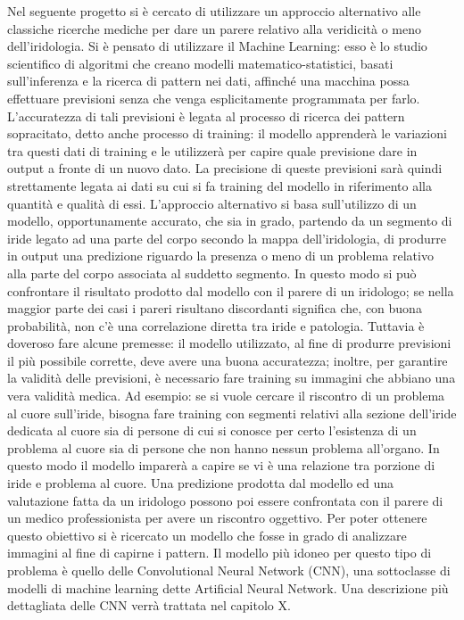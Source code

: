 Nel seguente progetto si è cercato di utilizzare un approccio alternativo alle classiche ricerche mediche per dare un parere relativo alla veridicità o meno dell’iridologia. Si è pensato di utilizzare il Machine Learning: esso è lo studio scientifico di algoritmi che creano modelli matematico-statistici, basati sull’inferenza e la ricerca di pattern nei dati, affinché una macchina possa effettuare previsioni senza che venga esplicitamente programmata per farlo. L’accuratezza di tali previsioni è legata al processo di ricerca dei pattern sopracitato, detto anche processo di training: il modello apprenderà le variazioni tra questi dati di training e le utilizzerà per capire quale previsione dare in output a fronte di un nuovo dato. La precisione di queste previsioni sarà quindi strettamente legata ai dati su cui si fa training del modello in riferimento alla quantità e qualità di essi. L’approccio alternativo si basa sull’utilizzo di un modello, opportunamente accurato, che sia in grado, partendo da un segmento di iride legato ad una parte del corpo secondo la mappa dell’iridologia, di produrre in output una predizione riguardo la presenza o meno di un problema relativo alla parte del corpo associata al suddetto segmento. In questo modo si può confrontare il risultato prodotto dal modello con il parere di un iridologo; se nella maggior parte dei casi i pareri risultano discordanti significa che, con buona probabilità, non c’è una correlazione diretta tra iride e patologia. Tuttavia è doveroso fare alcune premesse: il modello utilizzato, al fine di produrre previsioni il più possibile corrette, deve avere una buona accuratezza; inoltre, per garantire la validità delle previsioni, è necessario fare training su immagini che abbiano una vera validità medica. Ad esempio: se si vuole cercare il riscontro di un problema al cuore sull’iride, bisogna fare training con segmenti relativi alla sezione dell’iride dedicata al cuore sia di persone di cui si conosce per certo l’esistenza di un problema al cuore sia di persone che non hanno nessun problema all’organo. In questo modo il modello imparerà a capire se vi è una relazione tra porzione di iride e problema al cuore. Una predizione prodotta dal modello ed una valutazione fatta da un iridologo possono poi essere confrontata con il parere di un medico professionista per avere un riscontro oggettivo. Per poter ottenere questo obiettivo si è ricercato un modello che fosse in grado di analizzare immagini al fine di capirne i pattern. Il modello più idoneo per questo tipo di problema è quello delle Convolutional Neural Network (CNN), una sottoclasse di modelli di machine learning dette Artificial Neural Network. Una descrizione più dettagliata delle CNN verrà trattata nel capitolo X.
